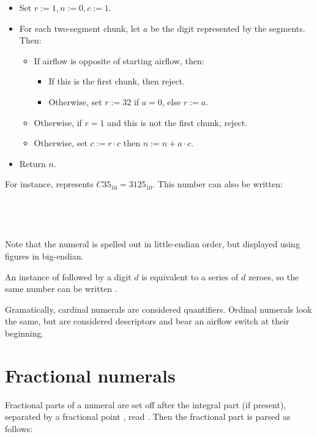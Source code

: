 \documentclass{book}
\begin{document}
\begin{itemize}
  \item Set $r := 1, n := 0, c := 1$.
  \item For each two-segment chunk, let $a$ be the digit represented by the segments. Then:
  \begin{itemize}
    \item If airflow is opposite of starting airflow, then:
    \begin{itemize}
      \item If this is the first chunk, then reject.
      \item Otherwise, set $r := 32$ if $a = 0$, else $r := a$.
    \end{itemize}
    \item Otherwise, if $r = 1$ and this is not the first chunk, reject.
    \item Otherwise, set $c := r \cdot c$ then $n := n + a \cdot c$.
  \end{itemize}
  \item Return $n$.
\end{itemize}

For instance,  represents $C35_{16} = 3125_{10}$. This number can also be written: \\
~\\
 \\
 \\
 \\

Note that the numeral is spelled out in little-endian order, but displayed using figures in big-endian.

An instance of  followed by a digit $d$ is equivalent to a series of $d$ zeroes, so the same number can be written .

Gramatically, cardinal numerals are considered quantifiers. Ordinal numerals look the same, but are considered descriptors and bear an airflow switch at their beginning.

\section{Fractional numerals}

Fractional parts of a numeral are set off after the integral part (if present), separated by a fractional point \hortho{\textvariko{,}}, read . Then the fractional part is parsed as follows:
\end{document}
